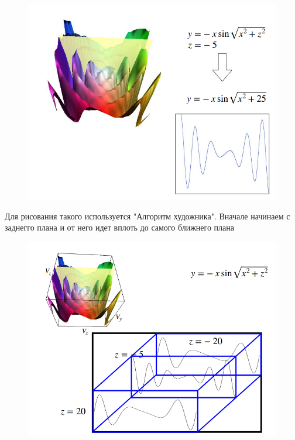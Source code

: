 \documentclass{article}
\begin{document}
\begin{figure} [H]
    \includegraphics[width=1\linewidth]{Снимок экрана 2025-03-17 132538.png}
\end{figure}


Для рисования такого используется "Алгоритм художника".
Вначале начинаем с заднегго плана и от него идет вплоть до самого ближнего плана


\begin{figure} [H]
    \includegraphics[width=1\linewidth]{Снимок экрана 2025-03-17 132808.png}
\end{figure}
\end{document}

